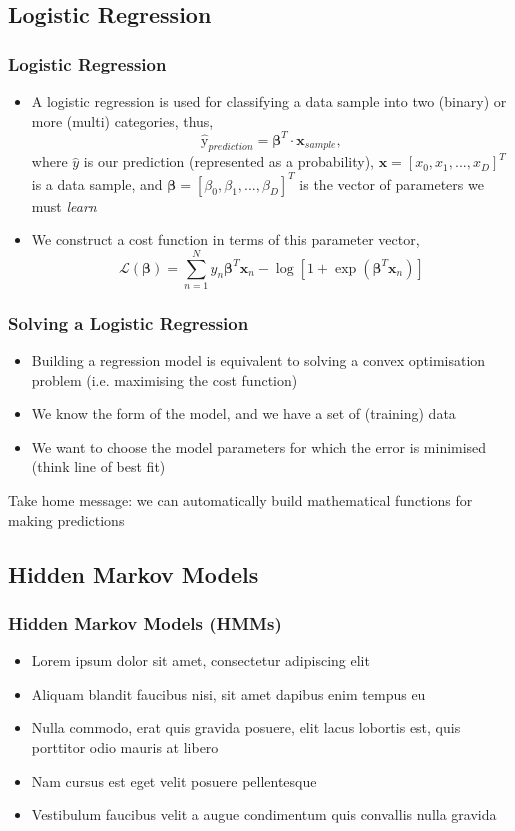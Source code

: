 \documentclass{beamer}
\begin{document}
\subsection{Logistic Regression}
\begin{frame}
\frametitle{Logistic Regression}
\begin{itemize}
\item A logistic regression is used for classifying a data sample into two (binary) or more (multi) categories, thus,
$$\hat{\text{y}}_{prediction} = \boldsymbol\beta^{T} \cdot \boldsymbol{x}_{sample},$$
where $\hat{y}$ is our prediction (represented as a probability), $\boldsymbol{x} = [x_0, x_1, ..., x_D]^T$ is a data sample, and $\boldsymbol\beta = [\beta_0, \beta_1, ..., \beta_D]^T$ is the vector of parameters we must \emph{learn}
\item We construct a cost function in terms of this parameter vector,
$$\mathcal{L}(\boldsymbol\beta) = \sum_{n=1}^N y_n\boldsymbol\beta^T\boldsymbol{x}_n - \log[1 + \exp(\boldsymbol\beta^T\boldsymbol{x}_n)]$$
\end{itemize}
\end{frame}


\begin{frame}
\frametitle{Solving a Logistic Regression}\begin{itemize}
\item Building a regression model is equivalent to solving a convex optimisation problem (i.e. maximising the cost function)
\item We know the form of the model, and we have a set of (training) data
\item We want to choose the model parameters for which the error is minimised (think line of best fit)
\end{itemize}
Take home message: we can automatically build mathematical functions for making predictions
\end{frame}


\subsection{Hidden Markov Models}
\begin{frame}
\frametitle{Hidden Markov Models (HMMs)}
\begin{itemize}
\item Lorem ipsum dolor sit amet, consectetur adipiscing elit
\item Aliquam blandit faucibus nisi, sit amet dapibus enim tempus eu
\item Nulla commodo, erat quis gravida posuere, elit lacus lobortis est, quis porttitor odio mauris at libero
\item Nam cursus est eget velit posuere pellentesque
\item Vestibulum faucibus velit a augue condimentum quis convallis nulla gravida
\end{itemize}
\end{frame}
\end{document}
